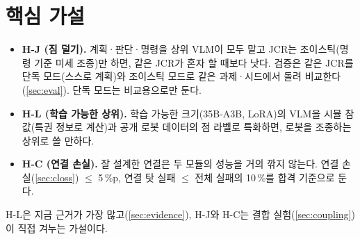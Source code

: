 \section{핵심 가설}
\label{sec:hyp}

\begin{itemize}
  \item \textbf{H-J (짐 덜기).} 계획·판단·명령을 상위 VLM이 모두 맡고 JCR는 조이스틱(명령 기준 미세 조종)만 하면, 같은 JCR가 혼자 할 때보다 낫다. 검증은 같은 JCR를 단독 모드(스스로 계획)와 조이스틱 모드로 같은 과제·시드에서 돌려 비교한다(\cref{sec:eval}). 단독 모드는 비교용으로만 둔다.
  \item \textbf{H-L (학습 가능한 상위).} 학습 가능한 크기(35B-A3B, LoRA)의 VLM을 시뮬 참값(특권 정보로 계산)과 공개 로봇 데이터의 점 라벨로 특화하면, 로봇을 조종하는 상위로 쓸 만하다.
  \item \textbf{H-C (연결 손실).} 잘 설계한 연결은 두 모듈의 성능을 거의 깎지 않는다. 연결 손실(\cref{sec:closs}) $\le$ 5\,\%p, 연결 탓 실패 $\le$ 전체 실패의 10\,\%를 합격 기준으로 둔다.
\end{itemize}
H-L은 지금 근거가 가장 많고(\cref{sec:evidence}), H-J와 H-C는 결합 실험(\cref{sec:coupling})이 직접 겨누는 가설이다.
